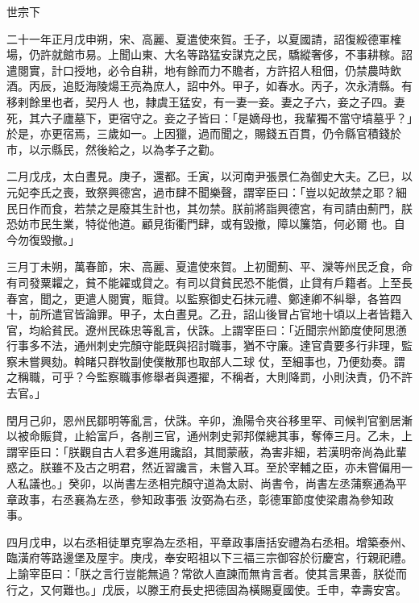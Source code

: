 
\begin{pinyinscope}

 世宗下



 二十一年正月戊申朔，宋、高麗、夏遣使來賀。壬子，以夏國請，詔復綏德軍榷場，仍許就館市易。上聞山東、大名等路猛安謀克之民，驕縱奢侈，不事耕稼。詔遣閱實，計口授地，必令自耕，地有餘而力不贍者，方許招人租佃，仍禁農時飲酒。丙辰，追貶海陵煬王亮為庶人，詔中外。甲子，如春水。丙子，次永清縣。有移剌餘里也者，契丹人
 也，隸虞王猛安，有一妻一妾。妻之子六，妾之子四。妻死，其六子廬墓下，更宿守之。妾之子皆曰：「是嫡母也，我輩獨不當守墳墓乎？」於是，亦更宿焉，三歲如一。上因獵，過而聞之，賜錢五百貫，仍令縣官積錢於市，以示縣民，然後給之，以為孝子之勸。



 二月戊戌，太白晝見。庚子，還都。壬寅，以河南尹張景仁為御史大夫。乙巳，以元妃李氏之喪，致祭興德宮，過市肆不聞樂聲，謂宰臣曰：「豈以妃故禁之耶？細民日作而食，若禁之是廢其生計也，其勿禁。朕前將詣興德宮，有司請由薊門，朕恐妨市民生業，特從他道。顧見街衢門肆，或有毀撤，障以簾箔，何必爾
 也。自今勿復毀撤。」



 三月丁未朔，萬春節，宋、高麗、夏遣使來賀。上初聞薊、平、灤等州民乏食，命有司發粟糶之，貧不能糴或貸之。有司以貸貧民恐不能償，止貸有戶籍者。上至長春宮，聞之，更遣人閱實，賑貸。以監察御史石抹元禮、鄭達卿不糾舉，各笞四十，前所遣官皆論罪。甲子，太白晝見。乙丑，詔山後冒占官地十頃以上者皆籍入官，均給貧民。遼州民硃忠等亂言，伏誅。上謂宰臣曰：「近聞宗州節度使阿思懣行事多不法，通州刺史完顏守能既與招討職事，猶不守廉。達官貴要多行非理，監察未嘗興劾。斡睹只群牧副使僕散那也取部人二球
 仗，至細事也，乃便劾奏。謂之稱職，可乎？今監察職事修舉者與遷擢，不稱者，大則降罰，小則決責，仍不許去官。」



 閏月己卯，恩州民鄒明等亂言，伏誅。辛卯，漁陽令夾谷移里罕、司候判官劉居漸以被命賑貸，止給富戶，各削三官，通州刺史郭邦傑總其事，奪俸三月。乙未，上謂宰臣曰：「朕觀自古人君多進用讒諂，其間蒙蔽，為害非細，若漢明帝尚為此輩惑之。朕雖不及古之明君，然近習讒言，未嘗入耳。至於宰輔之臣，亦未嘗偏用一人私議也。」癸卯，以尚書左丞相完顏守道為太尉、尚書令，尚書左丞蒲察通為平章政事，右丞襄為左丞，參知政事張
 汝弼為右丞，彰德軍節度使梁肅為參知政事。



 四月戊申，以右丞相徒單克寧為左丞相，平章政事唐括安禮為右丞相。增築泰州、臨潢府等路邊堡及屋宇。庚戌，奉安昭祖以下三福三宗御容於衍慶宮，行親祀禮。上諭宰臣曰：「朕之言行豈能無過？常欲人直諫而無肯言者。使其言果善，朕從而行之，又何難也。」戊辰，以滕王府長史把德固為橫賜夏國使。壬申，幸壽安宮。




\end{pinyinscope}

